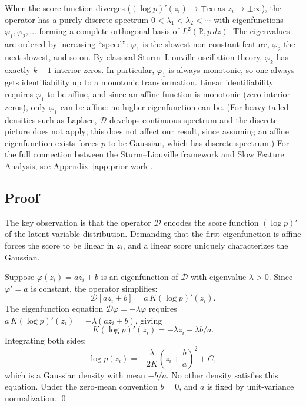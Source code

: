 When the score function diverges ($(\log p)'(z_i) \to \mp\infty$ as $z_i \to \pm\infty$), the operator has a purely discrete spectrum $0 < \lambda_1 < \lambda_2 < \cdots$ with eigenfunctions $\varphi_1, \varphi_2, \ldots$ forming a complete orthogonal basis of $L^2(\mathbb{R}, p\,dz)$.
The eigenvalues are ordered by increasing ``speed'': $\varphi_1$ is the slowest non-constant feature, $\varphi_2$ the next slowest, and so on.
By classical Sturm--Liouville oscillation theory, $\varphi_k$ has exactly $k-1$ interior zeros.
In particular, $\varphi_1$ is always monotonic, so one always gets identifiability up to a monotonic transformation.
Linear identifiability requires $\varphi_1$ to be affine, and since an affine function is monotonic (zero interior zeros), only $\varphi_1$ can be affine: no higher eigenfunction can be.
(For heavy-tailed densities such as Laplace, $\mathcal{D}$ develops continuous spectrum and the discrete picture does not apply; this does not affect our result, since assuming an affine eigenfunction exists forces $p$ to be Gaussian, which has discrete spectrum.)
For the full connection between the Sturm--Liouville framework and Slow Feature Analysis, see Appendix~\ref{app:prior-work}.

\subsection{Proof}

The key observation is that the operator $\mathcal{D}$ encodes the score function $(\log p)'$ of the latent variable distribution.
Demanding that the first eigenfunction is affine forces the score to be linear in $z_i$, and a linear score uniquely characterizes the Gaussian.

Suppose $\varphi(z_i) = a z_i + b$ is an eigenfunction of $\mathcal{D}$ with eigenvalue $\lambda > 0$.
Since $\varphi' = a$ is constant, the operator simplifies:
\begin{equation}
    \mathcal{D}[a z_i + b] = a\,K(\log p)'(z_i).
\end{equation}
The eigenfunction equation $\mathcal{D}\varphi = -\lambda\varphi$ requires $a\,K(\log p)'(z_i) = -\lambda(a z_i + b)$, giving
\begin{equation}
    K(\log p)'(z_i) = -\lambda z_i - \lambda b/a.
\end{equation}
Integrating both sides:
\begin{equation}
    \log p(z_i) = -\frac{\lambda}{2K}
    \left(z_i + \frac{b}{a}\right)^2 + C,
\end{equation}
which is a Gaussian density with mean $-b/a$.
No other density satisfies this equation.
Under the zero-mean convention $b = 0$, and $a$ is fixed by unit-variance normalization. \qed





